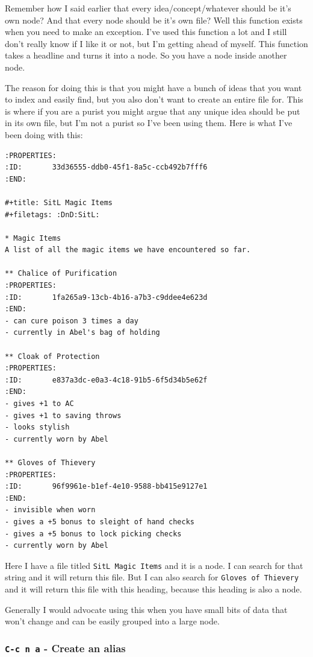 \documentclass[11pt]{article}
\begin{document}
Remember how I said earlier that every idea/concept/whatever should be it's own node? And that every node should be it's own file? Well this function exists when you need to make an exception. I've used this function a lot and I still don't really know if I like it or not, but I'm getting ahead of myself. This function takes a headline and turns it into a node. So you have a node inside another node.

The reason for doing this is that you might have a bunch of ideas that you want to index and easily find, but you also don't want to create an entire file for. This is where if you are a purist you might argue that any unique idea should be put in its own file, but I'm not a purist so I've been using them. Here is what I've been doing with this:

\begin{verbatim}
:PROPERTIES:
:ID:       33d36555-ddb0-45f1-8a5c-ccb492b7fff6
:END:

#+title: SitL Magic Items
#+filetags: :DnD:SitL:

* Magic Items
A list of all the magic items we have encountered so far.

** Chalice of Purification
:PROPERTIES:
:ID:       1fa265a9-13cb-4b16-a7b3-c9ddee4e623d
:END:
- can cure poison 3 times a day
- currently in Abel's bag of holding

** Cloak of Protection
:PROPERTIES:
:ID:       e837a3dc-e0a3-4c18-91b5-6f5d34b5e62f
:END:
- gives +1 to AC
- gives +1 to saving throws
- looks stylish
- currently worn by Abel

** Gloves of Thievery
:PROPERTIES:
:ID:       96f9961e-b1ef-4e10-9588-bb415e9127e1
:END:
- invisible when worn
- gives a +5 bonus to sleight of hand checks
- gives a +5 bonus to lock picking checks
- currently worn by Abel
\end{verbatim}

Here I have a file titled \texttt{SitL Magic Items} and it is a node. I can search for that string and it will return this file. But I can also search for \texttt{Gloves of Thievery} and it will return this file with this heading, because this heading is also a node.

Generally I would advocate using this when you have small bits of data that won't change and can be easily grouped into a large node.
\subsubsection*{\texttt{C-c n a} - Create an alias}
\label{sec:orgac6b7bf}
\end{document}
